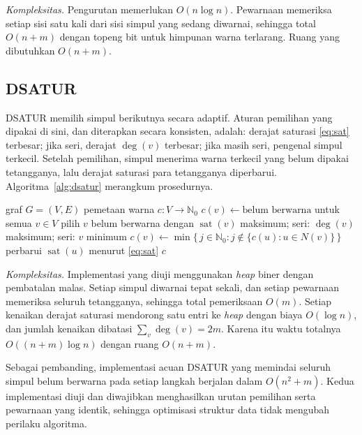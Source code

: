 \documentclass[conference,a4paper]{IEEEtran}
\begin{document}
\emph{Kompleksitas.} Pengurutan memerlukan $O(n\log n)$. Pewarnaan memeriksa
setiap sisi satu kali dari sisi simpul yang sedang diwarnai, sehingga total
$O(n+m)$ dengan topeng bit untuk himpunan warna terlarang. Ruang yang
dibutuhkan $O(n+m)$.

\subsection{DSATUR}
DSATUR memilih simpul berikutnya secara adaptif. Aturan pemilihan yang dipakai
di sini, dan diterapkan secara konsisten, adalah: derajat saturasi
\eqref{eq:sat} terbesar; jika seri, derajat $\deg(v)$ terbesar; jika masih
seri, pengenal simpul terkecil. Setelah pemilihan, simpul menerima warna
terkecil yang belum dipakai tetangganya, lalu derajat saturasi para tetangganya
diperbarui. Algoritma~\ref{alg:dsatur} merangkum prosedurnya.

\begin{algorithm}[!t]
\caption{DSATUR \emph{greedy}}
\label{alg:dsatur}
\begin{algorithmic}[1]
\Require graf $G=(V,E)$
\Ensure pemetaan warna $c:V\to\mathbb{N}_0$
\State $c(v)\gets\text{belum berwarna}$ untuk semua $v\in V$
  \State pilih $v$ belum berwarna dengan $\operatorname{sat}(v)$ maksimum;
         seri: $\deg(v)$ maksimum; seri: $v$ minimum
  \State $c(v)\gets\min\{\,j\in\mathbb{N}_0 : j\notin\{c(u):u\in N(v)\}\,\}$
    \State perbarui $\operatorname{sat}(u)$ menurut \eqref{eq:sat}
  \EndFor
\EndWhile
\State \Return $c$
\end{algorithmic}
\end{algorithm}

\emph{Kompleksitas.} Implementasi yang diuji menggunakan \emph{heap} biner
dengan pembatalan malas. Setiap simpul diwarnai tepat sekali, dan setiap
pewarnaan memeriksa seluruh tetangganya, sehingga total pemeriksaan $O(m)$.
Setiap kenaikan derajat saturasi mendorong satu entri ke \emph{heap} dengan
biaya $O(\log n)$, dan jumlah kenaikan dibatasi $\sum_v \deg(v)=2m$. Karena itu
waktu totalnya $O\!\left((n+m)\log n\right)$ dengan ruang $O(n+m)$.

Sebagai pembanding, implementasi acuan DSATUR yang memindai seluruh simpul
belum berwarna pada setiap langkah berjalan dalam $O(n^2+m)$. Kedua
implementasi diuji dan diwajibkan menghasilkan urutan pemilihan serta pewarnaan
yang identik, sehingga optimisasi struktur data tidak mengubah perilaku
algoritma.
\end{document}
